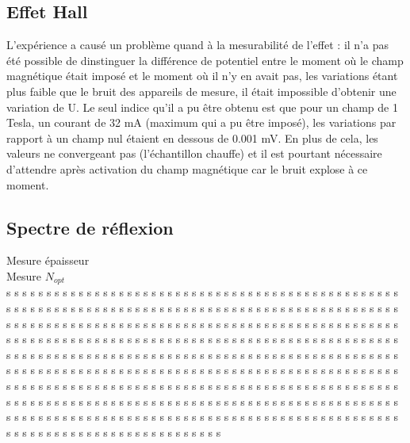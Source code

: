 \documentclass[a4paper,12pt,oneside]{article}
\begin{document}
\subsection{Effet Hall}

L'expérience a causé un problème quand à la mesurabilité de l'effet : il n'a pas été possible de dinstinguer la différence de potentiel entre le moment où le champ magnétique était imposé et le moment où il n'y en avait pas, les variations étant plus faible que le bruit des appareils de mesure, il était impossible d'obtenir une variation de U. Le seul indice qu'il a pu être obtenu est que pour un champ de 1 Tesla, un courant de 32 mA (maximum qui a pu être imposé), les variations par rapport à un champ nul étaient en dessous de 0.001 mV. En plus de cela, les valeurs ne convergeant pas (l'échantillon chauffe) et il est pourtant nécessaire d'attendre après activation du champ magnétique car le bruit explose à ce moment.


\subsection{Spectre de réflexion}

Mesure épaisseur \\
Mesure $N_{opt}$ \\
s s s s s s s s s s s s s s s s s s s s s s s s s s s s s s s s s s s s s s s s s s s s s s s s s s s s s s s s s s s s s s s s s s s s s s s s s s s s s s s s s s s s s s s s s s s s s s s s s s s s s s s s s s s s s s s s s s s s s s s s s s s s s s s s s s s s s s s s s s s s s s s s s s s s s s s s s s s s s s s s s s s s s s s s s s s s s s s s s s s s s s s s s s s s s s s s s s s s s s s s s s s s s s s s s s s s s s s s s s s s s s s s s s s s s s s s s s s s s s s s s s s s s s s s s s s s s s s s s s s s s s s s s s s s s s s s s s s s s s s s s s s s s s s s s s s s s s s s s s s s s s s s s s s s s s s s s s s s s s s s s s s s s s s s s s s s s s s s s s s s s s s s s s s s s s s s s s s s s s s s s s s s s s s s s s s s s s s s s s s s s s s s s s s s s s s s s s s s s s s s s s s s s s s s s s s s s s s s s s s s s s s s s s s s s s s s s s s s s s s s s s s s s s s s s s s s s s s s s s s s s s s s s s s s 
\end{document}
